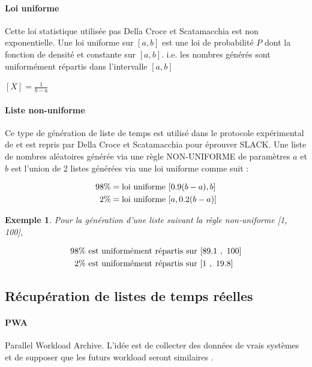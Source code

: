 \documentclass[a4paper,12pt]{report}
\theoremstyle{plain}				%
\newtheorem{example}{Exemple}
\theoremstyle{definition}				%
\newcommand\dcs{Della Croce et Scatamacchia\xspace}
\newcommand{\lp}[1]{\todo[author=LP,color=yellow,inline]{#1}}
\newcommand{\jb}[1]{\todo[author=JB,color=orange,inline]{#1}}
\begin{document}
\paragraph{Loi uniforme} 
Cette loi statistique utilisée pas \dcs est non exponentielle. 
Une loi uniforme sur $[a, b]$ est une loi de probabilité $P$ dont la fonction de densité et 
  constante sur $[a, b]$. i.e. les nombres générés sont uniformément répartis dans l'intervalle $[a, b]$

\begin{center}
$[X] = \frac{1}{b-a}$
\end{center}

\paragraph{Liste non-uniforme}
Ce type de génération de liste de temps est utilisé dans le protocole expérimental de \cite{frangioni2004multi} et est repris par \dcs \cite{della2020longest} pour éprouver SLACK.
Une liste de nombres aléatoires générée via une règle NON-UNIFORME de paramètres $a$ et $b$ 
  est l'union de 2 listes générées via une loi uniforme comme suit :

\begin{align*}
	98 \%  &= \textnormal{loi uniforme } [0.9(b-a), b] \\
	2\%    &= \textnormal{loi uniforme } [a, 0.2(b-a)] 
\end{align*}

\jb{En vrai, ça devrait être $[a + 0.9 (b-a), b]$ et $[a, a + 0.2 (b-a)]$}

\begin{example}
Pour la génération d'une liste suivant la règle non-uniforme [1, 100], 

\begin{align*}
	98 \%  &\textnormal{ est uniformément répartis sur } [89.1~,~ 100] \\
	2\%    &\textnormal{ est uniformément répartis sur } [1   ~,~ 19.8] 
\end{align*}

\end{example}
\lp{}
 
\subsection{Récupération de listes de temps réelles}\label{ssec:instancesGenerationListesTempsReelles}

\paragraph{PWA} Parallel Workload Archive. L'idée est de collecter des données de vrais systèmes et de 
  supposer que les futurs workload seront similaires \cite{feitelson2014experience}.
\end{document}
